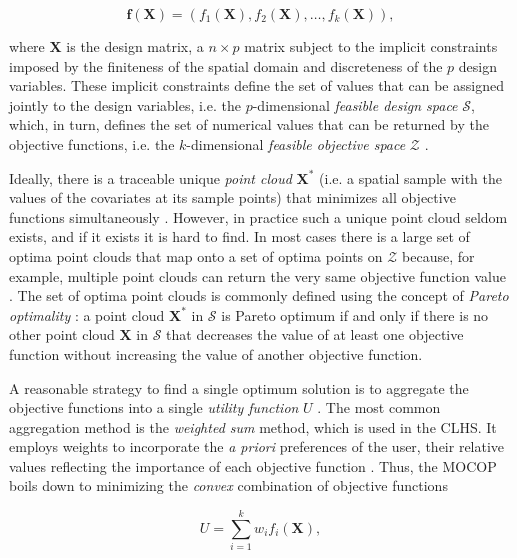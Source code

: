 \begin{equation}
 \boldsymbol{f}(\boldsymbol{X}) = (f_1(\boldsymbol{X}), f_2(\boldsymbol{X}), \ldots, f_k(\boldsymbol{X})),
\end{equation}

\noindent where $\boldsymbol{X}$ is the design matrix, a $n \times p$ matrix subject to the implicit 
constraints imposed by the finiteness of the spatial domain and discreteness of the $p$ design variables. 
These implicit constraints define the set of values that can be assigned jointly to the design variables, i.e. 
the $p$-dimensional \emph{feasible design space} $\mathcal{S}$, which, in turn, defines the set of numerical 
values that can be returned by the objective functions, i.e. the $k$-dimensional \emph{feasible objective 
space} $\mathcal{Z}$ \cite{MarlerEtAl2004}.

Ideally, there is a traceable unique \emph{point cloud} $\boldsymbol{X}^*$ (i.e. a spatial sample with the 
values of the covariates at its sample points) that minimizes all objective functions simultaneously 
\cite{MarlerEtAl2009}. However, in practice such a unique point cloud seldom exists, and if it exists it is 
hard to find. In most cases there is a large set of optima point clouds that map onto a set of optima points 
on $\mathcal{Z}$ because, for example, multiple point clouds can return the very same objective function value 
\cite{Arora2011}. The set of optima point clouds is commonly defined using the concept of \emph{Pareto 
optimality} \cite{MarlerEtAl2004}: a point cloud $\boldsymbol{X}^*$ in $\mathcal{S}$ is Pareto optimum if and 
only if there is no other point cloud $\boldsymbol{X}$ in $\mathcal{S}$ that decreases the value of at least 
one objective function without increasing the value of another objective function.

A reasonable strategy to find a single optimum solution is to aggregate the objective functions into a single 
\emph{utility function} $U$ \cite{MarlerEtAl2005}. The most common aggregation method is the \emph{weighted 
sum} method, which is used in the CLHS. It employs weights to incorporate the \emph{a priori} preferences of 
the user, their relative values reflecting the importance of each objective function \cite{MarlerEtAl2009}. 
Thus, the MOCOP boils down to minimizing the \emph{convex} combination of objective functions

\begin{equation}
 U = \sum_{i=1}^{k} w_i f_i(\boldsymbol{X}),
\end{equation}\label{eq:chap08-utility}

